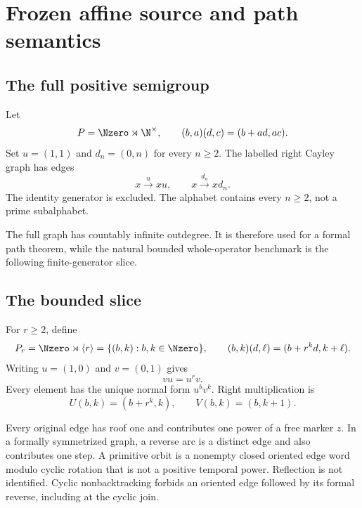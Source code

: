 \section{Frozen affine source and path semantics}
\label{sec:source}

\subsection{The full positive semigroup}

Let
\begin{equation}
P=\Nzero\rtimes\N^{\times},\qquad
(b,a)(d,c)=(b+ad,ac).
\label{eq:affine-product}
\end{equation}
Set $u=(1,1)$ and $d_n=(0,n)$ for every $n\ge2$.  The labelled right Cayley
graph has edges
\[
x\xrightarrow{u}xu,\qquad x\xrightarrow{d_n}xd_n.
\]
The identity generator is excluded.  The alphabet contains every $n\ge2$,
not a prime subalphabet.

The full graph has countably infinite outdegree.  It is therefore used for a
formal path theorem, while the natural bounded whole-operator benchmark is
the following finite-generator slice.

\subsection{The bounded slice}

For $r\ge2$, define
\begin{equation}
P_r=\Nzero\rtimes\langle r\rangle
=\{(b,k):b,k\in\Nzero\},\qquad
(b,k)(d,\ell)=(b+r^kd,k+\ell).
\label{eq:slice-product}
\end{equation}
Writing $u=(1,0)$ and $v=(0,1)$ gives
\begin{equation}
vu=u^rv.
\label{eq:affine-relation}
\end{equation}
Every element has the unique normal form $u^bv^k$.  Right multiplication is
\begin{equation}
U(b,k)=(b+r^k,k),\qquad V(b,k)=(b,k+1).
\label{eq:right-actions}
\end{equation}

\begin{convention}
Every original edge has roof one and contributes one power of a free marker
$z$.  In a formally symmetrized graph, a reverse arc is a distinct edge and
also contributes one step.  A primitive orbit is a nonempty closed oriented
edge word modulo cyclic rotation that is not a positive temporal power.
Reflection is not identified.  Cyclic nonbacktracking forbids an oriented
edge followed by its formal reverse, including at the cyclic join.
\end{convention}


